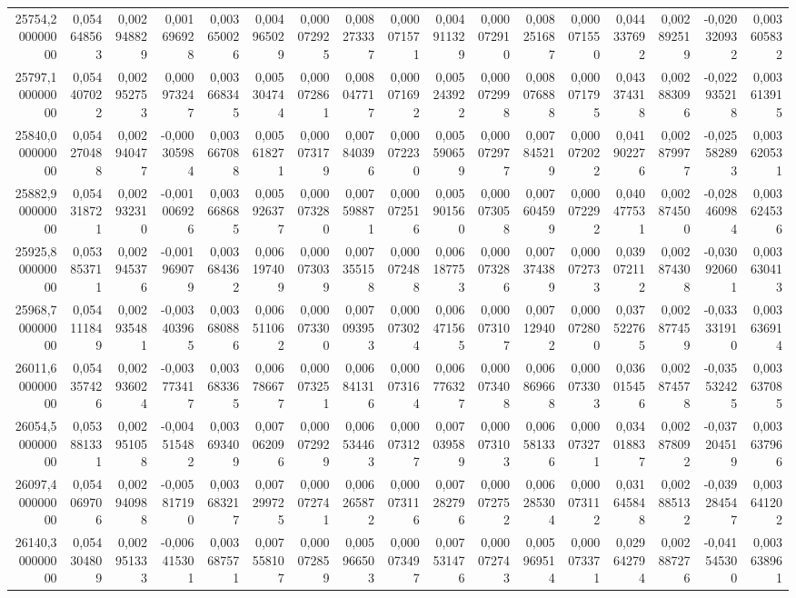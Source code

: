 \begin{longtable}{rrrrrrrrrrrrrrrrr}
25754,200000000 & 0,054648563 & 0,002948829 & 0,001696928 & 0,003650026 & 0,004965029 & 0,000072925 & 0,008273337 & 0,000071571 & 0,004911329 & 0,000072910 & 0,008251687 & 0,000071550 & 0,044337692 & 0,002892519 & -0,020320932 & 0,003605832\\
25797,100000000 & 0,054407022 & 0,002952753 & 0,000973247 & 0,003668345 & 0,005304744 & 0,000072861 & 0,008047717 & 0,000071692 & 0,005243922 & 0,000072998 & 0,008076888 & 0,000071795 & 0,043374318 & 0,002883096 & -0,022935218 & 0,003613915\\
25840,000000000 & 0,054270488 & 0,002940477 & -0,000305984 & 0,003667088 & 0,005618271 & 0,000073179 & 0,007840396 & 0,000072230 & 0,005590659 & 0,000072977 & 0,007845219 & 0,000072022 & 0,041902276 & 0,002879977 & -0,025582893 & 0,003620531\\
25882,900000000 & 0,054318721 & 0,002932310 & -0,001006926 & 0,003668685 & 0,005926377 & 0,000073280 & 0,007598871 & 0,000072516 & 0,005901560 & 0,000073058 & 0,007604599 & 0,000072292 & 0,040477531 & 0,002874500 & -0,028460984 & 0,003624536\\
25925,800000000 & 0,053853711 & 0,002945376 & -0,001969079 & 0,003684362 & 0,006197409 & 0,000073039 & 0,007355158 & 0,000072488 & 0,006187753 & 0,000073286 & 0,007374389 & 0,000072733 & 0,039072112 & 0,002874308 & -0,030920601 & 0,003630413\\
25968,700000000 & 0,054111849 & 0,002935481 & -0,003403965 & 0,003680886 & 0,006511062 & 0,000073300 & 0,007093953 & 0,000073024 & 0,006471565 & 0,000073107 & 0,007129402 & 0,000072800 & 0,037522765 & 0,002877459 & -0,033331910 & 0,003636914\\
26011,600000000 & 0,054357426 & 0,002936024 & -0,003773417 & 0,003683365 & 0,006786677 & 0,000073251 & 0,006841316 & 0,000073164 & 0,006776327 & 0,000073408 & 0,006869668 & 0,000073303 & 0,036015456 & 0,002874578 & -0,035532425 & 0,003637085\\
26054,500000000 & 0,053881331 & 0,002951058 & -0,004515482 & 0,003693409 & 0,007062096 & 0,000072929 & 0,006534463 & 0,000073127 & 0,007039589 & 0,000073103 & 0,006581336 & 0,000073271 & 0,034018837 & 0,002878092 & -0,037204519 & 0,003637966\\
26097,400000000 & 0,054069706 & 0,002940988 & -0,005817190 & 0,003683217 & 0,007299725 & 0,000072741 & 0,006265872 & 0,000073116 & 0,007282796 & 0,000072752 & 0,006285304 & 0,000073112 & 0,031645848 & 0,002885132 & -0,039284547 & 0,003641202\\
26140,300000000 & 0,054304809 & 0,002951333 & -0,006415301 & 0,003687571 & 0,007558107 & 0,000072859 & 0,005966503 & 0,000073497 & 0,007531476 & 0,000072743 & 0,005969514 & 0,000073371 & 0,029642794 & 0,002887276 & -0,041545300 & 0,003638961\\

\end{longtable}
